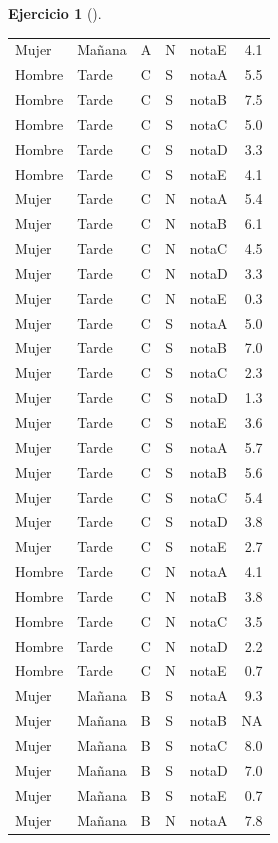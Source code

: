 \documentclass[
  a4paper,
]{scrreport}
\theoremstyle{definition}
\newtheorem{exercise}{Ejercicio}[chapter]
\theoremstyle{remark}
\begin{document}
\begin{exercise}[]
\begin{enumerate}
\begin{tcolorbox}
\begin{longtable}[]{@{}lllllr@{}}
  Mujer & Mañana & A & N & notaE & 4.1 \\
  Hombre & Tarde & C & S & notaA & 5.5 \\
  Hombre & Tarde & C & S & notaB & 7.5 \\
  Hombre & Tarde & C & S & notaC & 5.0 \\
  Hombre & Tarde & C & S & notaD & 3.3 \\
  Hombre & Tarde & C & S & notaE & 4.1 \\
  Mujer & Tarde & C & N & notaA & 5.4 \\
  Mujer & Tarde & C & N & notaB & 6.1 \\
  Mujer & Tarde & C & N & notaC & 4.5 \\
  Mujer & Tarde & C & N & notaD & 3.3 \\
  Mujer & Tarde & C & N & notaE & 0.3 \\
  Mujer & Tarde & C & S & notaA & 5.0 \\
  Mujer & Tarde & C & S & notaB & 7.0 \\
  Mujer & Tarde & C & S & notaC & 2.3 \\
  Mujer & Tarde & C & S & notaD & 1.3 \\
  Mujer & Tarde & C & S & notaE & 3.6 \\
  Mujer & Tarde & C & S & notaA & 5.7 \\
  Mujer & Tarde & C & S & notaB & 5.6 \\
  Mujer & Tarde & C & S & notaC & 5.4 \\
  Mujer & Tarde & C & S & notaD & 3.8 \\
  Mujer & Tarde & C & S & notaE & 2.7 \\
  Hombre & Tarde & C & N & notaA & 4.1 \\
  Hombre & Tarde & C & N & notaB & 3.8 \\
  Hombre & Tarde & C & N & notaC & 3.5 \\
  Hombre & Tarde & C & N & notaD & 2.2 \\
  Hombre & Tarde & C & N & notaE & 0.7 \\
  Mujer & Mañana & B & S & notaA & 9.3 \\
  Mujer & Mañana & B & S & notaB & NA \\
  Mujer & Mañana & B & S & notaC & 8.0 \\
  Mujer & Mañana & B & S & notaD & 7.0 \\
  Mujer & Mañana & B & S & notaE & 0.7 \\
  Mujer & Mañana & B & N & notaA & 7.8 \\

\end{longtable}
\end{tcolorbox}
\end{enumerate}
\end{exercise}
\end{document}
